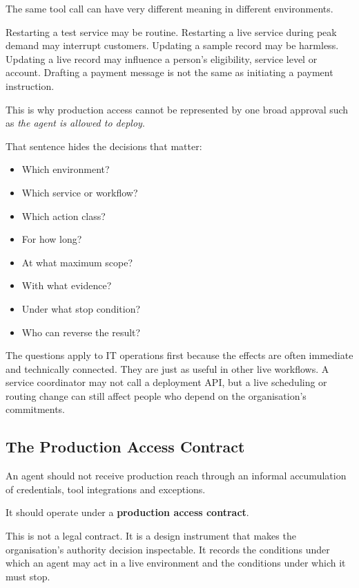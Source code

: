The same tool call can have very different meaning in different
environments.

Restarting a test service may be routine. Restarting a live service
during peak demand may interrupt customers. Updating a sample record may
be harmless. Updating a live record may influence a person's
eligibility, service level or account. Drafting a payment message is not
the same as initiating a payment instruction.

This is why production access cannot be represented by one broad
approval such as \emph{the agent is allowed to deploy}.

That sentence hides the decisions that matter:

\begin{itemize}
\tightlist
\item
  Which environment?
\item
  Which service or workflow?
\item
  Which action class?
\item
  For how long?
\item
  At what maximum scope?
\item
  With what evidence?
\item
  Under what stop condition?
\item
  Who can reverse the result?
\end{itemize}

The questions apply to IT operations first because the effects are often
immediate and technically connected. They are just as useful in other
live workflows. A service coordinator may not call a deployment API, but
a live scheduling or routing change can still affect people who depend
on the organisation's commitments.

\subsection{The Production Access
Contract}\label{the-production-access-contract}

An agent should not receive production reach through an informal
accumulation of credentials, tool integrations and exceptions.

It should operate under a \textbf{production access contract}.

This is not a legal contract. It is a design instrument that makes the
organisation's authority decision inspectable. It records the conditions
under which an agent may act in a live environment and the conditions
under which it must stop.

